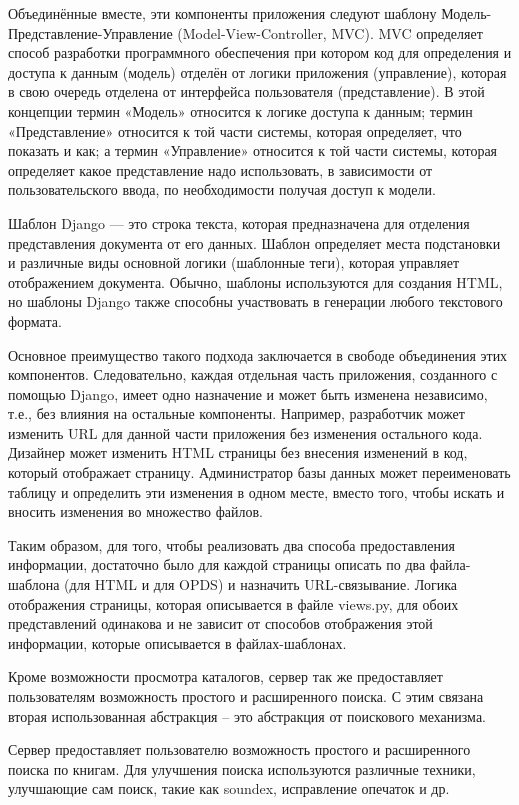 \documentclass[a4paper, 12pt]{report}
\begin{document}
 Объединённые вместе, эти компоненты приложения следуют шаблону Модель-Представление-Управление  (Model-View-Controller, MVC). MVC определяет способ разработки программного обеспечения при котором код для определения и доступа к данным (модель) отделён от логики приложения (управление), которая в свою очередь отделена от интерфейса пользователя (представление). В этой концепции термин «Модель» относится к логике доступа к данным; термин «Представление» относится к той части системы, которая определяет, что показать и как; а термин «Управление» относится к той части системы, которая определяет какое представление надо использовать, в зависимости от пользовательского ввода, по необходимости получая доступ к модели. 

Шаблон Django — это строка текста, которая предназначена для отделения представления документа от его данных. Шаблон определяет места подстановки и различные виды основной логики (шаблонные теги), которая управляет отображением документа. Обычно, шаблоны используются для создания HTML, но шаблоны Django также способны участвовать в генерации любого текстового формата.

Основное преимущество такого подхода заключается в свободе объединения этих компонентов. Следовательно, каждая отдельная часть приложения, созданного с помощью Django, имеет одно назначение и может быть изменена независимо, т.е., без влияния на остальные компоненты. Например, разработчик может изменить URL для данной части приложения без изменения остального кода. Дизайнер может изменить HTML страницы без внесения изменений в код, который отображает страницу. Администратор базы данных может переименовать таблицу и определить эти изменения в одном месте, вместо того, чтобы искать и вносить изменения во множество файлов.

Таким образом, для того, чтобы реализовать два способа предоставления информации, достаточно было для каждой страницы описать по два файла-шаблона (для HTML и для OPDS) и назначить URL-связывание. Логика отображения страницы, которая описывается в файле views.py, для обоих представлений одинакова и не зависит от способов отображения этой информации, которые описывается в файлах-шаблонах.

Кроме возможности просмотра каталогов, сервер так же предоставляет пользователям возможность простого и расширенного поиска. С этим связана вторая использованная абстракция -- это абстракция от поискового механизма. 

Сервер предоставляет пользователю возможность простого и расширенного поиска по книгам. Для улучшения поиска используются различные техники, улучшающие сам поиск, такие как soundex, исправление опечаток и др. %
\end{document}
